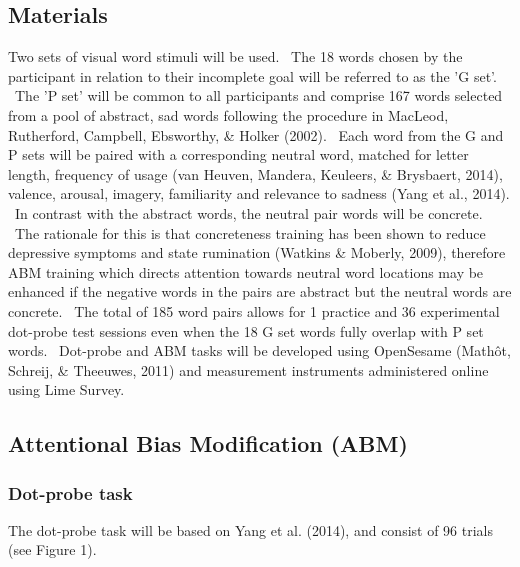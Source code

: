 \documentclass[man,a4paper,biblatex]{apa6}
\newcounter{Figure}
\begin{document}
\subsection{Materials}
Two sets of visual word stimuli will be used. \ The 18 words chosen by the participant in relation to their incomplete goal will be referred to as the 'G set'. \ The 'P set' will be common to all participants and comprise 167 words selected from a pool of abstract, sad words following the procedure in MacLeod, Rutherford, Campbell, Ebsworthy, \& Holker (2002). \ Each word from the G and P sets will be paired with a corresponding neutral word, matched for letter length, frequency of usage (van Heuven, Mandera, Keuleers, \& Brysbaert, 2014), valence, arousal, imagery, familiarity and relevance to sadness (Yang et al., 2014). \ In contrast with the abstract words, the neutral pair words will be concrete. \ The rationale for this is that concreteness training has been shown to reduce depressive symptoms and state rumination (Watkins \& Moberly, 2009), therefore ABM training which directs attention towards neutral word locations may be enhanced if the negative words in the pairs are abstract but the neutral words are concrete. \ The total of 185 word pairs allows for 1 practice and 36 experimental dot-probe test sessions even when the 18 G set words fully overlap with P set words. \ Dot-probe and ABM tasks will be developed using OpenSesame (Math\^ot, Schreij, \& Theeuwes, 2011) and measurement instruments administered online using Lime Survey.

\subsection{Attentional Bias Modification (ABM)}
\subsubsection{Dot-probe task}
The dot-probe task will be based on Yang et al. (2014), and consist of 96 trials (see Figure 1).
\end{document}
